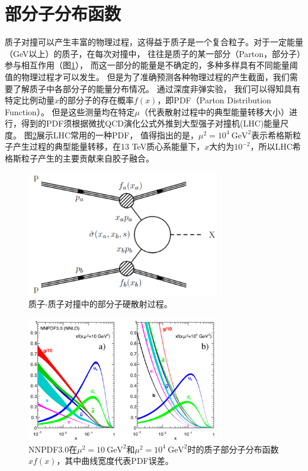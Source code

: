 
\section{部分子分布函数}
质子对撞可以产生丰富的物理过程，这得益于质子是一个复合粒子。对于一定能量（GeV以上）的质子，在每次对撞中，
往往是质子的某一部分（Parton，部分子）参与相互作用（图\ref{fig:pp_collision}），
而这一部分的能量是不确定的，多种多样具有不同能量阈值的物理过程才可以发生。
但是为了准确预测各种物理过程的产生截面，我们需要了解质子中各部分子的能量分布情况。
通过深度非弹实验\cite{Kuhlen:390284}，
我们可以得知具有特定比例动量$x$的部分子的存在概率$f(x)$，即PDF（Parton Distribution Function）。
但是这些测量均在特定$\mu$（代表散射过程中的典型能量转移大小）进行，得到的PDF须根据微扰QCD演化公式\cite{ellis_stirling_webber_1996}外推到大型强子对撞机(LHC)能量尺度。
图\ref{fig:NNPDF3}展示LHC常用的一种PDF，
值得指出的是，$\mu^2=10^4~\text{GeV}^2$表示希格斯粒子产生过程的典型能量转移，在13 TeV质心系能量下，$x$大约为$10^{-2}$，所以LHC希格斯粒子产生的主要贡献来自胶子融合。
\begin{figure}[h]
\centering
 \includegraphics[width=0.75\textwidth]{fig/inclusive_pp.png}
 \caption{质子-质子对撞中的部分子硬散射过程。}
 \label{fig:pp_collision}
\end{figure}
\begin{figure}[h]
\centering
 \includegraphics[width=0.75\textwidth]{fig/NNPDF3.png}
 \caption{NNPDF3.0\cite{Patrignani:2016xqp}在$\mu^2=10~\text{GeV}^2$和$\mu^2=10^4~\text{GeV}^2$时的质子部分子分布函数$xf(x)$，其中曲线宽度代表PDF误差。}
 \label{fig:NNPDF3}
\end{figure}
